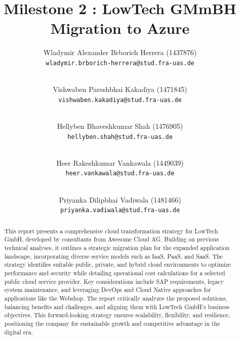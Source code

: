 \documentclass{llncs}
\newcommand{\what}{Milestone 2 : LowTech GMmBH Migration to Azure}
\begin{document}
%
%
%
\mainmatter              %
%
\title{\what}
%
\author{
    Wladymir Alexander Brborich Herrera (1437876)\\
    \texttt{wladymir.brborich-herrera@stud.fra-uas.de}
    \and\\
    Vishwaben Pareshbhai Kakadiya (1471845)\\
    \texttt{vishwaben.kakadiya@stud.fra-uas.de}
    \and\\
    Hellyben Bhaveshkumar Shah (1476905)\\
    \texttt{hellyben.shah@stud.fra-uas.de}
    \and\\
    Heer Rakeshkumar Vankawala (1449039)
    \\
    \texttt{heer.vankawala@stud.fra-uas.de}
    \and\\
    Priyanka Dilipbhai Vadiwala (1481466)\\
    \texttt{priyanka.vadiwala@stud.fra-uas.de}
}
%

\maketitle              %

\begin{abstract}
    This report presents a comprehensive cloud transformation strategy for LowTech GmbH, developed by consultants from Awesome Cloud AG. 
    Building on previous technical analyses, it outlines a strategic migration plan for the expanded application landscape, 
    incorporating diverse service models such as IaaS, PaaS, and SaaS. The strategy identifies suitable public, private, 
    and hybrid cloud environments to optimize performance and security while detailing operational cost calculations 
    for a selected public cloud service provider. Key considerations include SAP requirements, legacy system maintenance, 
    and leveraging DevOps and Cloud Native approaches for applications like the Webshop. 
    The report critically analyzes the proposed solutions, balancing benefits and challenges, 
    and aligning them with LowTech GmbH’s business objectives. This forward-looking strategy ensures scalability, flexibility, and resilience, positioning 
    the company for sustainable growth and competitive advantage in the digital era.

\end{abstract}
\end{document}
